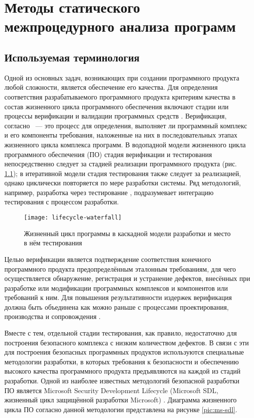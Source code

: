 \chapter{Методы статического межпроцедурного анализа программ} \label{chapt1}


\section{Используемая терминология}

Одной из основных задач, возникающих при создании программного продукта любой сложности, является обеспечение его качества. Для определения соответствия разрабатываемого программного продукта критериям качества в состав жизненного цикла программного обеспечения включают стадии или процессы верификации и валидации программных средств \cite{gost-12207, gost-34.601}. Верификация, согласно \cite{lipaev-zakaz}~--- это процесс для определения, выполняет ли программный комплекс и его компоненты требования, наложенные на них в последовательных этапах жизненного цикла комплекса программ. В водопадной модели жизненного цикла программного обеспечения (ПО) стадия верификации и тестирования непосредственно следует за стадией реализации программного продукта \cite{waterfall} (рис. \ref{pic:lifecycle-waterfall}); в итеративной модели стадия тестирования также следует за реализацией, однако циклически повторяется по мере разработки системы. Ряд методологий, например, разработка через тестирование \cite{tdd}, подразумевает интеграцию тестирования с процессом разработки. 

\begin{figure}[h]
   \centering
   \texttt{[image: lifecycle-waterfall]}
   \caption{Жизненный цикл программы в каскадной модели разработки и место в нём тестирования}\label{pic:lifecycle-waterfall}
\end{figure}

Целью верификации является подтверждение соответствия конечного программного продукта предопределённым эталонным требованиям, для чего осуществляется обнаружение, регистрация и устранение дефектов, внесённых при разработке или модификации программных комплексов и компонентов или требований к ним. Для повышения результативности издержек верификация должна быть объединена как можно раньше с процессами проектирования, производства и сопровождения \cite{lipaev-zakaz}.

Вместе с тем, отдельной стадии тестирования, как правило, недостаточно для построения безопасного комплекса с низким количеством дефектов. В связи с эти для построения безопасных программных продуктов используются специальные методологии разработки, в которых требования к безопасности и обеспечению высокого качества программного продукта предъявляются на каждой из стадий разработки. Одной из наиболее известных методологий безопасной разработки ПО является Microsoft Security Development Lifecycle (Microsoft SDL, жизненный цикл защищённой разработки Microsoft) \cite{ms-sdl}. Диаграмма жизненного цикла ПО согласно данной методологии представлена на рисунке \ref{pic:ms-sdl}. 

